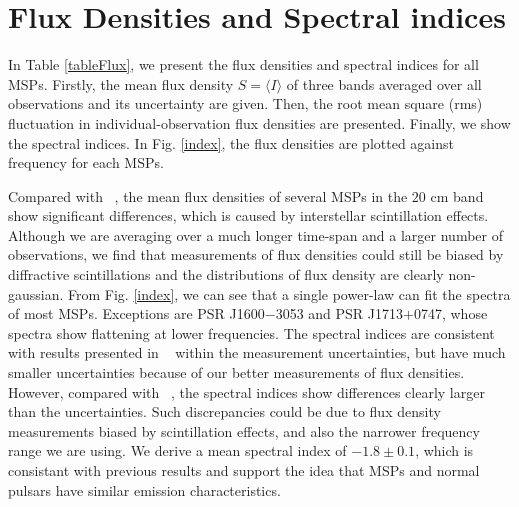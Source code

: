 \documentclass[useAMS,usenatbib]{mn2e}
\begin{document}


\section{Flux Densities and Spectral indices}

In Table \ref{tableFlux}, we present the flux densities and spectral indices 
for all MSPs.
%
Firstly, the mean flux density $S=\langle I\rangle$ of three bands averaged over all 
observations and its uncertainty are given. 
%
Then, the root mean square (rms) fluctuation in individual-observation flux 
densities are presented. Finally, we show the spectral indices.
%
In Fig. \ref{index}, the flux densities are plotted against frequency for each 
MSPs.
%

Compared with ~\citet{Yan11}, the mean flux densities of several MSPs in the $20$ cm 
band show significant differences, which is caused by interstellar scintillation effects.
%
Although we are averaging over a much longer time-span and a larger number of observations, 
we find that measurements of flux densities could still be biased by diffractive 
scintillations and the distributions of flux density are clearly non-gaussian.
%
From Fig. \ref{index}, we can see that a single power-law can fit the spectra 
of most MSPs. Exceptions are PSR J1600$-$3053 and PSR J1713$+$0747, whose spectra show 
flattening at lower frequencies.
%
The spectral indices are consistent with results presented in ~\citet{Toscano98} within 
the measurement uncertainties, but have much smaller uncertainties because of our 
better measurements of flux densities. 
%
However, compared with ~\citet{Kramer99}, the spectral indices show differences 
clearly larger than the uncertainties.
%
Such discrepancies could be due to flux density measurements biased by scintillation 
effects, and also the narrower frequency range we are using.
%
We derive a mean spectral index of $-1.8\pm0.1$, which is consistant with previous 
results and support the idea that MSPs and normal pulsars have similar emission 
characteristics.
%
\end{document}
